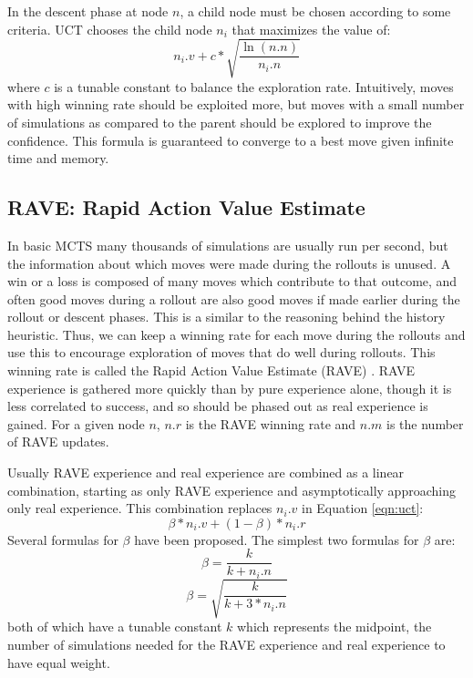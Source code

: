 In the descent phase at node $n$, a child node must be chosen according to some criteria. UCT chooses the child node $n_i$ that maximizes the value of:
\begin{equation}\label{eqn:uct} n_i.v + c*\sqrt{\frac{\ln(n.n)}{n_i.n}}\end{equation}
where $c$ is a tunable constant to balance the exploration rate. Intuitively, moves with high winning rate should be exploited more, but moves with a small number of simulations as compared to the parent should be explored to improve the confidence. This formula is guaranteed to converge to a best move given infinite time and memory.



\subsection{RAVE: Rapid Action Value Estimate}\label{sec:rave}

In basic MCTS many thousands of simulations are usually run per second, but the information about which moves were made during the rollouts is unused. A win or a loss is composed of many moves which contribute to that outcome, and often good moves during a rollout are also good moves if made earlier during the rollout or descent phases. This is a similar to the reasoning behind the history heuristic. Thus, we can keep a winning rate for each move during the rollouts and use this to encourage exploration of moves that do well during rollouts. This winning rate is called the Rapid Action Value Estimate (RAVE) \cite{gelly2007rave, gelly2011monte}. RAVE experience is gathered more quickly than by pure experience alone, though it is less correlated to success, and so should be phased out as real experience is gained. For a given node $n$,  $n.r$ is the RAVE winning rate and $n.m$ is the number of RAVE updates.

Usually RAVE experience and real experience are combined as a linear combination, starting as only RAVE experience and asymptotically approaching only real experience. This combination replaces $n_i.v$ in Equation \ref{eqn:uct}:
\begin{equation}\label{eqn:rave1} \beta*n_i.v + (1-\beta)*n_i.r \end{equation}
Several formulas for $\beta$ have been proposed. The simplest two formulas for $\beta$ are:
\begin{equation}\label{eqn:rave2} \beta = \frac{k}{k+n_i.n} \end{equation}
\begin{equation}\label{eqn:rave3} \beta = \sqrt{\frac{k}{k+3*n_i.n}} \end{equation}
 both of which have a tunable constant $k$ which represents the midpoint, the number of simulations needed for the RAVE experience and real experience to have equal weight.

